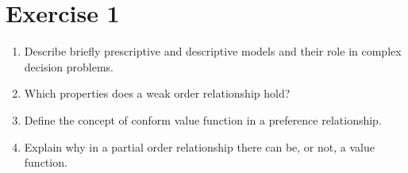 \documentclass[\main/main.tex]{subfiles}
\begin{document}
\section{Exercise 1}
\begin{enumerate}
  \item Describe briefly prescriptive and descriptive models and their role in complex decision problems.
  \item Which properties does a weak order relationship hold?
  \item Define the concept of conform value function in a preference relationship.
  \item Explain why in a partial order relationship there can be, or not, a value function.
\end{enumerate}
\end{document}
